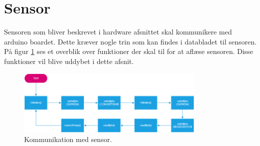 \section{Sensor}
Sensoren som bliver beskrevet i hardware afsnittet skal kommunikere med arduino boardet. Dette kræver nogle trin som kan findes i databladet til sensoren. På figur \ref{sensor_kom} ses et overblik over funktioner der skal til for at aflæse sensoren. Disse funktioner vil blive uddybet i dette afsnit.

\begin{figure}[h!]
  \centering
  \includegraphics[width=0.8\textwidth]{figures/ds18b20_sensor_communication.png}
  \caption{Kommunikation med sensor.}
  \label{sensor_kom}
\end{figure}
